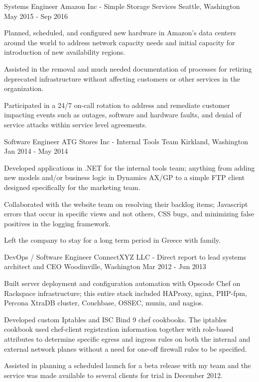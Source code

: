 
    \begin{cventries}
    
    \cventry
    {Systems Engineer}
    {Amazon Inc - Simple Storage Services}
    {Seattle, Washington}
    {May 2015 - Sep 2016}
    {
        \begin{cvitems}
        \item {Planned, scheduled, and configured new hardware in Amazon's data centers around the world to address network capacity needs and initial capacity for introduction of new availability regions.}
        \item {Assisted in the removal and much needed documentation of processes for retiring deprecated infrastructure without affecting customers or other services in the organization.}
        \item {Participated in a 24/7 on-call rotation to address and remediate customer impacting events such as outages, software and hardware faults, and denial of service attacks within service level agreements.}
        \end{cvitems}
    }

    \cventry
    {Software Engineer}
    {ATG Stores Inc - Internal Tools Team}
    {Kirkland, Washington}
    {Jan 2014 - May 2014}
    {
        \begin{cvitems}
        \item {Developed applications in .NET for the internal tools team; anything from adding new models and/or business logic in Dynamics AX/GP to a simple FTP client designed specifically for the marketing team.}
        \item {Collaborated with the website team on resolving their backlog items; Javascript errors that occur in specific views and not others, CSS bugs, and minimizing false positives in the logging framework.}
        \item {Left the company to stay for a long term period in Greece with family.}
        \end{cvitems}
    }

    \cventry
    {DevOps / Software Engineer}
    {ConnectXYZ LLC - Direct report to lead systems architect and CEO}
    {Woodinville, Washington}
    {Mar 2012 - Jun 2013}
    {
        \begin{cvitems}
        \item {Built server deployment and configuration automation with Opscode Chef on Rackspace infrastructure; this entire stack included HAProxy, nginx, PHP-fpm, Percona XtraDB cluster, Couchbase, OSSEC, munin, and nagios.}
        \item {Developed custom Iptables and ISC Bind 9 chef cookbooks. The iptables cookbook used chef-client registration information together with role-based attributes to determine specific egress and ingress rules on both the internal and external network planes without a need for one-off firewall rules to be specified.}
        \item {Assisted in planning a scheduled launch for a beta release with my team and the service was made available to several clients for trial in December 2012.}
        \end{cvitems}
    }


\end{cventries}
